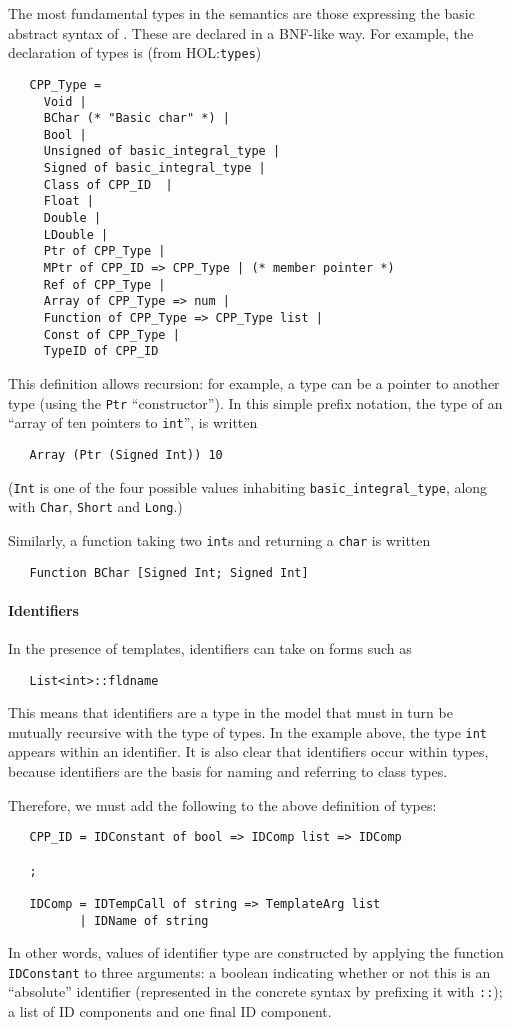 \documentclass[11pt]{article}
\newcommand{\HOLfile}[1]{HOL:\texttt{#1}}
\begin{document}
The most fundamental types in the semantics are those expressing the
basic abstract syntax of \cpp{}.  These are declared in a BNF-like
way.  For example, the declaration of \cpp{} types is (from
\HOLfile{types})
\begin{verbatim}
   CPP_Type =
     Void |
     BChar (* "Basic char" *) |
     Bool |
     Unsigned of basic_integral_type |
     Signed of basic_integral_type |
     Class of CPP_ID  |
     Float |
     Double |
     LDouble |
     Ptr of CPP_Type |
     MPtr of CPP_ID => CPP_Type | (* member pointer *)
     Ref of CPP_Type |
     Array of CPP_Type => num |
     Function of CPP_Type => CPP_Type list |
     Const of CPP_Type |
     TypeID of CPP_ID
\end{verbatim}
This definition allows recursion: for example, a \cpp{} type can be a
pointer to another \cpp{} type (using the \texttt{Ptr}
``constructor'').  In this simple prefix notation, the type of an
``array of ten pointers to \texttt{int}'', is written
\begin{verbatim}
   Array (Ptr (Signed Int)) 10
\end{verbatim}
(\texttt{Int} is one of the four possible values inhabiting
\texttt{basic_integral_type}, along with \texttt{Char}, \texttt{Short}
and \texttt{Long}.)

Similarly, a function taking two \texttt{int}s and returning a
\texttt{char} is written
\begin{verbatim}
   Function BChar [Signed Int; Signed Int]
\end{verbatim}

\paragraph{Identifiers}
In the presence of templates, identifiers can take on forms such as
\begin{verbatim}
   List<int>::fldname
\end{verbatim}

This means that identifiers are a type in the model that must in turn
be mutually recursive with the type of types.  In the example above,
the type \texttt{int} appears within an identifier.  It is also clear
that identifiers occur within types, because identifiers are the basis
for naming and referring to class types.

Therefore, we must add the following to the above definition of \cpp{}
types:
\begin{verbatim}
   CPP_ID = IDConstant of bool => IDComp list => IDComp

   ;

   IDComp = IDTempCall of string => TemplateArg list
          | IDName of string
\end{verbatim}
In other words, values of identifier type are constructed by applying
the function \texttt{IDConstant} to three arguments: a boolean
indicating whether or not this is an ``absolute'' identifier
(represented in the concrete syntax by prefixing it with \texttt{::});
a list of ID components and one final ID component.
\end{document}
